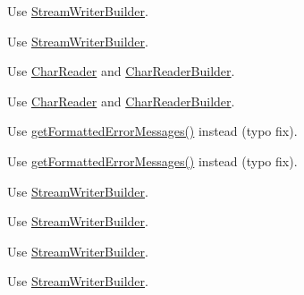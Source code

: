 
\begin{DoxyRefList}
\item[\label{deprecated__deprecated000008}%
\hypertarget{deprecated__deprecated000008}{}%
Class \hyperlink{class_json_1_1_fast_writer}{Json\+:\+:Fast\+Writer} ]Use \hyperlink{class_json_1_1_stream_writer_builder}{Stream\+Writer\+Builder}. 

Use \hyperlink{class_json_1_1_stream_writer_builder}{Stream\+Writer\+Builder}.  
\item[\label{deprecated__deprecated000005}%
\hypertarget{deprecated__deprecated000005}{}%
Class \hyperlink{class_json_1_1_reader}{Json\+:\+:Reader} ]Use \hyperlink{class_json_1_1_char_reader}{Char\+Reader} and \hyperlink{class_json_1_1_char_reader_builder}{Char\+Reader\+Builder}. 

Use \hyperlink{class_json_1_1_char_reader}{Char\+Reader} and \hyperlink{class_json_1_1_char_reader_builder}{Char\+Reader\+Builder}.  
\item[\label{deprecated__deprecated000006}%
\hypertarget{deprecated__deprecated000006}{}%
Member \hyperlink{class_json_1_1_reader_a791cbc5afd1bef1631e07239dc452c79}{Json\+:\+:Reader\+:\+:get\+Formated\+Error\+Messages} () const]Use \hyperlink{class_json_1_1_reader_ae638a7b1f36f7ccf99ba89fa36ccf222}{get\+Formatted\+Error\+Messages()} instead (typo fix). 

Use \hyperlink{class_json_1_1_reader_ae638a7b1f36f7ccf99ba89fa36ccf222}{get\+Formatted\+Error\+Messages()} instead (typo fix).  
\item[\label{deprecated__deprecated000010}%
\hypertarget{deprecated__deprecated000010}{}%
Class \hyperlink{class_json_1_1_styled_stream_writer}{Json\+:\+:Styled\+Stream\+Writer} ]Use \hyperlink{class_json_1_1_stream_writer_builder}{Stream\+Writer\+Builder}. 

Use \hyperlink{class_json_1_1_stream_writer_builder}{Stream\+Writer\+Builder}.  
\item[\label{deprecated__deprecated000009}%
\hypertarget{deprecated__deprecated000009}{}%
Class \hyperlink{class_json_1_1_styled_writer}{Json\+:\+:Styled\+Writer} ]Use \hyperlink{class_json_1_1_stream_writer_builder}{Stream\+Writer\+Builder}. 

Use \hyperlink{class_json_1_1_stream_writer_builder}{Stream\+Writer\+Builder}.  
\item[\label{deprecated__deprecated000002}%
\hypertarget{deprecated__deprecated000002}{}%
Member \hyperlink{class_json_1_1_value_a1dfd5d30fbc53fcd9c4955b8b3e7885c}{Json\+:\+:Value\+:\+:remove\+Member} (const J\+S\+O\+N\+C\+P\+P\+\_\+\+S\+T\+R\+I\+NG \&key)]



\end{DoxyRefList}
